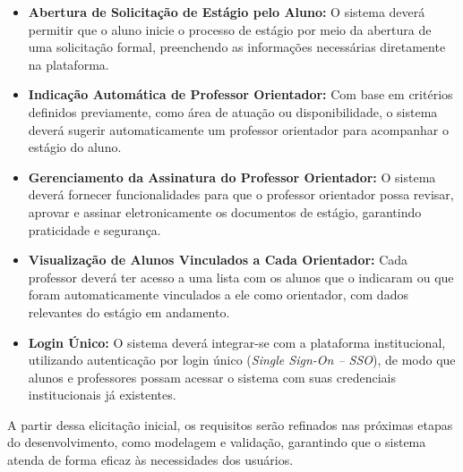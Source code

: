 \begin{itemize}
    \item \textbf{Abertura de Solicitação de Estágio pelo Aluno:} O sistema deverá permitir que o aluno inicie o processo de estágio por meio da abertura de uma solicitação formal, preenchendo as informações necessárias diretamente na plataforma.
    
    \item \textbf{Indicação Automática de Professor Orientador:} Com base em critérios definidos previamente, como área de atuação ou disponibilidade, o sistema deverá sugerir automaticamente um professor orientador para acompanhar o estágio do aluno.
    
    \item \textbf{Gerenciamento da Assinatura do Professor Orientador:} O sistema deverá fornecer funcionalidades para que o professor orientador possa revisar, aprovar e assinar eletronicamente os documentos de estágio, garantindo praticidade e segurança.
    
    \item \textbf{Visualização de Alunos Vinculados a Cada Orientador:} Cada professor deverá ter acesso a uma lista com os alunos que o indicaram ou que foram automaticamente vinculados a ele como orientador, com dados relevantes do estágio em andamento.
    
    \item \textbf{Login Único:} O sistema deverá integrar-se com a plataforma institucional, utilizando autenticação por login único (\textit{Single Sign-On – SSO}), de modo que alunos e professores possam acessar o sistema com suas credenciais institucionais já existentes.
\end{itemize}

A partir dessa elicitação inicial, os requisitos serão refinados nas próximas etapas do desenvolvimento, como modelagem e validação, garantindo que o sistema atenda de forma eficaz às necessidades dos usuários.
